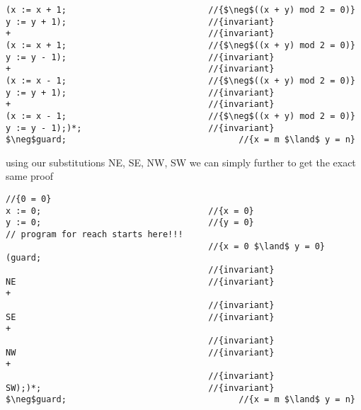 \documentclass{article}
\begin{document}
\begin{enumerate}[(a)]
\begin{lstlisting}[language=Maple,mathescape=true]
(x := x + 1;                            //{$\neg$((x + y) mod 2 = 0)}
y := y + 1);                            //{invariant}
+                                       //{invariant} 
(x := x + 1;                            //{$\neg$((x + y) mod 2 = 0)}
y := y - 1);                            //{invariant}
+                                       //{invariant}
(x := x - 1;                            //{$\neg$((x + y) mod 2 = 0)}
y := y + 1);                            //{invariant}          
+                                       //{invariant}
(x := x - 1;                            //{$\neg$((x + y) mod 2 = 0)}
y := y - 1);)*;                         //{invariant}
$\neg$guard;                                  //{x = m $\land$ y = n}

    \end{lstlisting} 
using our substitutions NE, SE, NW, SW we can simply further to get the exact same proof
    \begin{lstlisting}[language=Maple,mathescape=true]
                                        //{0 = 0}
x := 0;                                 //{x = 0}
y := 0;                                 //{y = 0}
// program for reach starts here!!!
                                        //{x = 0 $\land$ y = 0}
(guard;
                                        //{invariant}
NE                                      //{invariant}
+                                        
                                        //{invariant}
SE                                      //{invariant}
+                                       
                                        //{invariant}
NW                                      //{invariant}
+       
                                        //{invariant}
SW);)*;                                 //{invariant}
$\neg$guard;                                  //{x = m $\land$ y = n}

    \end{lstlisting}
\end{enumerate}

\newpage
\end{document}
